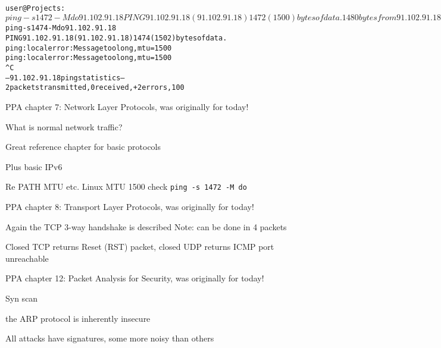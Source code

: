 \documentclass[Screen16to9,17pt]{foils}
\begin{document}

\begin{alltt}\footnotesize
user@Projects:~$ ping -s 1472 -M do 91.102.91.18
PING 91.102.91.18 (91.102.91.18) 1472(1500) bytes of data.
1480 bytes from 91.102.91.18: icmp_seq=1 ttl=244 time=7.43 ms
1480 bytes from 91.102.91.18: icmp_seq=2 ttl=244 time=7.20 ms
...
user@Projects:~$ ping -s 1474 -M do 91.102.91.18
PING 91.102.91.18 (91.102.91.18) 1474(1502) bytes of data.
ping: local error: Message too long, mtu=1500
ping: local error: Message too long, mtu=1500
^C
--- 91.102.91.18 ping statistics ---
2 packets transmitted, 0 received, +2 errors, 100% packet loss, time 1025ms
\end{alltt}

\begin{list1}
\item PPA chapter 7: Network Layer Protocols, was originally for today!
\begin{list2}
\item What is normal network traffic?
\item Great reference chapter for basic protocols
\item Plus basic IPv6
\item Re PATH MTU etc. Linux MTU 1500 check \verb+ping -s 1472 -M do+
\end{list2}
\end{list1}



\begin{list1}
\item PPA chapter 8: Transport Layer Protocols, was originally for today!
\begin{list2}
\item Again the TCP 3-way handshake is described Note: can be done in 4 packets
\item Closed TCP returns Reset (RST) packet, closed UDP returns ICMP port unreachable
\end{list2}
\end{list1}




\begin{list1}
\item PPA chapter 12: Packet Analysis for Security, was originally for today!
\begin{list2}
\item Syn scan
\item the ARP protocol is inherently insecure
\item All attacks have signatures, some more noisy than others
\end{list2}
\end{list1}
\end{document}

